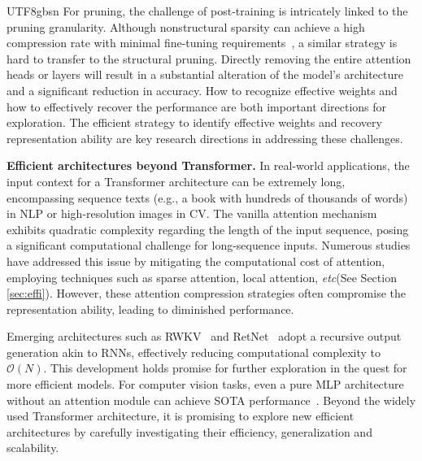 \documentclass[10pt,journal,compsoc]{IEEEtran}
\newcommand{\etc}{\emph{etc}}
\newcommand{\<}{\left\langle}
\renewcommand{\>}{\right\rangle}
\renewcommand{\O}{\mathcal{O}}
\newcommand{\1}{\mathbbm{1}}
\begin{document}
\begin{CJK}{UTF8}{gbsn}
For pruning,  the challenge of post-training is intricately linked to the pruning granularity. Although nonstructural sparsity can achieve a high compression rate with minimal fine-tuning requirements~\cite{Frantar2023SparseGPTML}, a similar strategy is hard to transfer to the structural pruning. Directly removing the entire attention heads or layers will result in a substantial alteration of the model's architecture and a  significant reduction in accuracy.  How to recognize effective weights and how to effectively recover the performance are both important directions for exploration.
The efficient strategy to  identify effective weights and recovery representation ability are key research directions in addressing these challenges.  


\noindent\textbf{Efficient architectures beyond Transformer.}
In real-world applications, the input context for a Transformer architecture can be extremely long, encompassing sequence texts (e.g., a book with hundreds of thousands of words) in NLP or high-resolution images in CV. The vanilla attention mechanism exhibits quadratic complexity regarding the length of the input sequence, posing a significant computational challenge for long-sequence inputs.  Numerous studies have addressed this issue by mitigating the computational cost of attention, employing techniques such as sparse attention, local attention, \etc (See Section \ref{sec:effi}). However, these attention compression strategies often compromise the representation ability, leading to diminished performance.

Emerging architectures such as RWKV~\cite{peng2023rwkv} and RetNet~\cite{sun2023retentive}  adopt a recursive output generation akin to RNNs, effectively reducing computational complexity to $\O(N)$. This development holds promise for further exploration in the quest for more efficient models.  For computer vision tasks, even a pure MLP architecture without an attention module can achieve SOTA performance~\cite{tolstikhin2021mlp,chen2021cyclemlp,tang2022image,touvron2022resmlp,guo2022hire}. Beyond the widely used Transformer architecture, it is promising to explore new efficient architectures by carefully investigating their efficiency, generalization and scalability. 




\renewcommand\refname{References}
{\small
	
	
}

	
\end{CJK}
\end{document}
